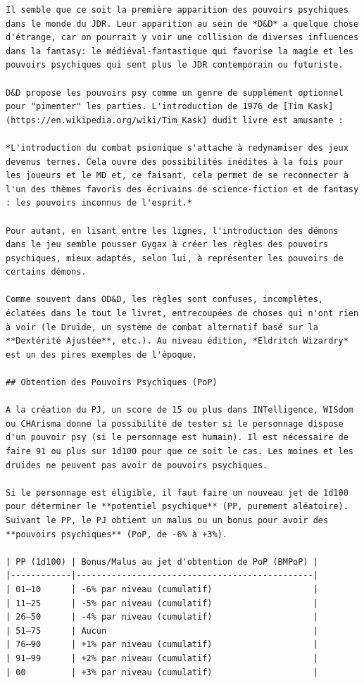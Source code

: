 \documentclass[11pt]{article}
\begin{document}
{\begin{verbatim}
Il semble que ce soit la première apparition des pouvoirs psychiques dans le monde du JDR. Leur apparition au sein de *D&D* a quelque chose d'étrange, car on pourrait y voir une collision de diverses influences dans la fantasy: le médiéval-fantastique qui favorise la magie et les pouvoirs psychiques qui sent plus le JDR contemporain ou futuriste.

D&D propose les pouvoirs psy comme un genre de supplément optionnel pour "pimenter" les parties. L'introduction de 1976 de [Tim Kask](https://en.wikipedia.org/wiki/Tim_Kask) dudit livre est amusante :

*L'introduction du combat psionique s'attache à redynamiser des jeux devenus ternes. Cela ouvre des possibilités inédites à la fois pour les joueurs et le MD et, ce faisant, cela permet de se reconnecter à l'un des thèmes favoris des écrivains de science-fiction et de fantasy : les pouvoirs inconnus de l'esprit.*

Pour autant, en lisant entre les lignes, l'introduction des démons dans le jeu semble pousser Gygax à créer les règles des pouvoirs psychiques, mieux adaptés, selon lui, à représenter les pouvoirs de certains démons.

Comme souvent dans OD&D, les règles sont confuses, incomplètes, éclatées dans le tout le livret, entrecoupées de choses qui n'ont rien à voir (le Druide, un système de combat alternatif basé sur la **Dextérité Ajustée**, etc.). Au niveau édition, *Eldritch Wizardry* est un des pires exemples de l'époque.

## Obtention des Pouvoirs Psychiques (PoP)

A la création du PJ, un score de 15 ou plus dans INTelligence, WISdom ou CHArisma donne la possibilité de tester si le personnage dispose d'un pouvoir psy (si le personnage est humain). Il est nécessaire de faire 91 ou plus sur 1d100 pour que ce soit le cas. Les moines et les druides ne peuvent pas avoir de pouvoirs psychiques.

Si le personnage est éligible, il faut faire un nouveau jet de 1d100 pour déterminer le **potentiel psychique** (PP, purement aléatoire). Suivant le PP, le PJ obtient un malus ou un bonus pour avoir des **pouvoirs psychiques** (PoP, de -6% à +3%).

| PP (1d100) | Bonus/Malus au jet d'obtention de PoP (BMPoP) |
|------------|-----------------------------------------------|
| 01–10      | -6% par niveau (cumulatif)                    |
| 11–25      | -5% par niveau (cumulatif)                    |
| 26–50      | -4% par niveau (cumulatif)                    |
| 51–75      | Aucun                                         |
| 76–90      | +1% par niveau (cumulatif)                    |
| 91–99      | +2% par niveau (cumulatif)                    |
| 00         | +3% par niveau (cumulatif)                    |


\end{verbatim}}
\end{document}
